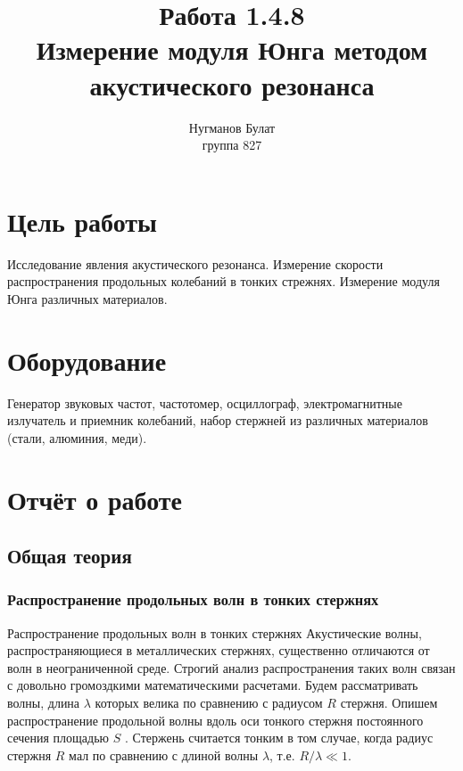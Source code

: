 \documentclass[a4paper, 12pt]{article}%
\author{Нугманов Булат \\ группа 827}
\title{Работа 1.4.8 \\ Измерение модуля Юнга методом 
акустического резонанса}
\begin{document}
\maketitle
\tableofcontents
\newpage
\section{Цель работы}
Исследование явления акустического резонанса. Измерение скорости
распространения продольных колебаний в тонких стрежнях. Измерение модуля Юнга различных материалов. 
\section{Оборудование}
Генератор звуковых частот, частотомер, осциллограф,
электромагнитные излучатель и приемник колебаний, набор стержней из различных материалов (стали, алюминия, меди).
\section{Отчёт о работе}
\subsection{Общая теория}
\subsubsection{Распространение продольных волн в тонких стержнях}
Распространение продольных волн в тонких стержнях 
Акустические волны, распространяющиеся в металлических стержнях,
существенно отличаются от волн в неограниченной среде. Строгий анализ
распространения таких волн связан с довольно громоздкими математическими
расчетами. Будем рассматривать волны, длина $\lambda$ которых велика по
сравнению с радиусом $R$ стержня. Опишем распространение продольной
волны вдоль оси тонкого стержня постоянного сечения площадью $S$ .
Стержень считается тонким в том случае, когда радиус стержня $R$ мал по
сравнению с длиной волны $\lambda$, т.е. $R/\lambda\ll 1$.
\end{document}
